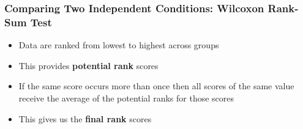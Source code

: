 \documentclass[12pt, block=fill]{beamer}
\begin{document}
\begin{frame}
  \frametitle{Comparing Two Independent Conditions: Wilcoxon Rank-Sum Test}
  
  \begin{itemize}
    \item Data are ranked from lowest to highest across groups
    \item This provides \textbf{potential rank} scores
    \item If the same score occurs more than once then all scores of the same value receive the average of the potential ranks for those scores
  \end{itemize}
  
  \begin{center}
  \end{center}

  \begin{itemize}
      \item This gives us the \textbf{final rank} scores
  \end{itemize}
\end{frame}
\end{document}
